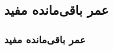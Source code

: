 \documentclass[xcolor=dvipsnames, professionalfonts, aspectratio=169, 11pt]{beamer}
\begin{document}
\begin{persian}
\begin{frame}
%	
%					
%		
%		
%		
%		
%					
\end{frame}











\subsection{عمر باقی‌مانده مفید}
\begin{frame}
	\frametitle{عمر باقی‌مانده مفید}
	

\end{frame}
\end{persian}
\end{document}
